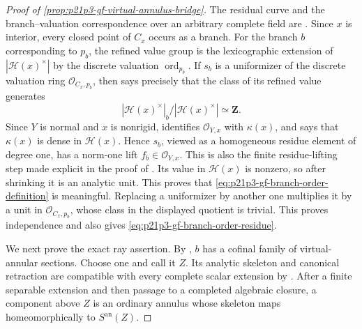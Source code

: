 
\begin{proof}[Proof of
\cref{prop:p21p3-gf-virtual-annulus-bridge}]
The residual curve and the branch--valuation correspondence over an
arbitrary complete field are
\cite[\S\S3.3.5.2, 4.2.6, 4.2.9, and 4.2.11.1]
{Ducros24CurveStructure}.  Since \(x\)
is interior, every closed point of \(C_x\) occurs as a branch.  For the branch
\(b\) corresponding to \(p_b\), the refined value group is the lexicographic
extension of \(|\mathcal H(x)^{\times}|\) by the discrete valuation
\(\operatorname{ord}_{p_b}\).  If \(s_b\) is a uniformizer of the discrete
valuation ring \(\mathcal O_{C_x,p_b}\), then
\cite[\S4.2.11.1]{Ducros24CurveStructure} says precisely that the class of
its refined value generates
\[
 |\mathcal H(x)^{\times}|_b/|\mathcal H(x)^{\times}|\simeq\mathbf Z.
\]
Since \(Y\) is normal and \(x\) is nonrigid,
\cite[\S4.2.18]{Ducros24CurveStructure} identifies
\(\mathcal O_{Y,x}\) with \(\kappa(x)\), and
\cite[\S4.2.6]{Ducros24CurveStructure} says that \(\kappa(x)\) is dense in
\(\mathcal H(x)\).  Hence \(s_b\), viewed as a homogeneous residue element
of degree one, has a norm-one lift \(f_b\in\mathcal O_{Y,x}\).  This is also
the finite residue-lifting step made explicit in the proof of
\cite[Lemma~6.14]{GJR26}.  Its value in \(\mathcal H(x)\) is nonzero, so
after shrinking it is an analytic unit.  This proves that
\eqref{eq:p21p3-gf-branch-order-definition} is meaningful.  Replacing a
uniformizer by another one multiplies it by a unit in
\(\mathcal O_{C_x,p_b}\), whose class in the displayed quotient is trivial.
This proves independence and also gives
\eqref{eq:p21p3-gf-branch-order-residue}.

We next prove the exact ray assertion.  By
\cite[Proposition~4.3.9(2) and \S\S4.3.10.2--4.3.10.3]
{Ducros24CurveStructure}, \(b\) has a cofinal family of virtual-annular
sections.  Choose one and call it \(Z\).  Its analytic skeleton and canonical
retraction are compatible with every complete scalar extension by
\cite[\S\S3.6.35.5--3.6.35.10]{Ducros24CurveStructure}.  After a finite
separable extension and then passage to a completed algebraic closure, a
component above \(Z\) is an ordinary annulus whose skeleton maps
homeomorphically to \(S^{\mathrm{an}}(Z)\).


\end{proof}
